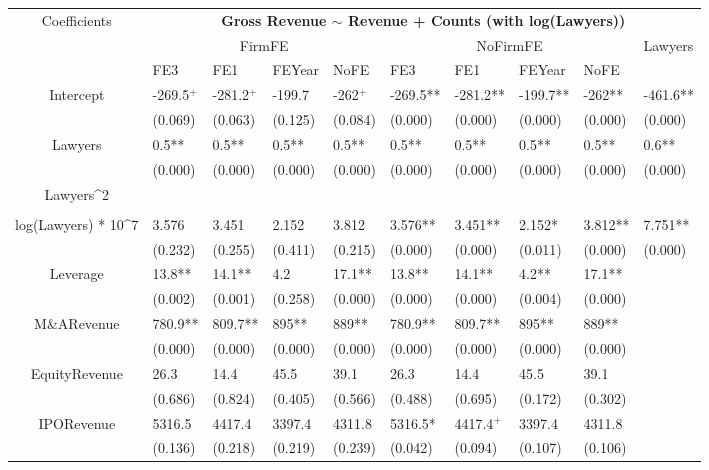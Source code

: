 \documentclass{article}
\begin{document}
\begin{table}[H]
\centering
\begin{tabular}{|clllllllll|}
\hline
\multirow{3}{*}{Coefficients} & \multicolumn{9}{c|}{\textbf{Gross Revenue $\sim$ Revenue + Counts (with log(Lawyers))}} \\
\cline{2-10}
& \multicolumn{4}{c}{FirmFE} & \multicolumn{4}{c}{NoFirmFE} & \multirow{2}{*}{Lawyers} \\
\cline{2-9}
& FE3 & FE1 & FEYear & NoFE & FE3 & FE1 & FEYear & NoFE &  \\
\hline
 
Intercept & -269.5$^{+}$ & -281.2$^{+}$ & -199.7 & -262$^{+}$ & -269.5** & -281.2** & -199.7** & -262** & -461.6** \\ 
   & (0.069) & (0.063) & (0.125) & (0.084) & (0.000) & (0.000) & (0.000) & (0.000) & (0.000) \\ 
  Lawyers & 0.5** & 0.5** & 0.5** & 0.5** & 0.5** & 0.5** & 0.5** & 0.5** & 0.6** \\ 
   & (0.000) & (0.000) & (0.000) & (0.000) & (0.000) & (0.000) & (0.000) & (0.000) & (0.000) \\ 
  Lawyers^2 &  &  &  &  &  &  &  &  &  \\ 
   &  &  &  &  &  &  &  &  &  \\ 
  log(Lawyers) * 10^7 & 3.576 & 3.451 & 2.152 & 3.812 & 3.576** & 3.451** & 2.152* & 3.812** & 7.751** \\ 
   & (0.232) & (0.255) & (0.411) & (0.215) & (0.000) & (0.000) & (0.011) & (0.000) & (0.000) \\ 
  Leverage & 13.8** & 14.1** & 4.2 & 17.1** & 13.8** & 14.1** & 4.2** & 17.1** &  \\ 
   & (0.002) & (0.001) & (0.258) & (0.000) & (0.000) & (0.000) & (0.004) & (0.000) &  \\ 
  M\&ARevenue & 780.9** & 809.7** & 895** & 889** & 780.9** & 809.7** & 895** & 889** &  \\ 
   & (0.000) & (0.000) & (0.000) & (0.000) & (0.000) & (0.000) & (0.000) & (0.000) &  \\ 
  EquityRevenue & 26.3 & 14.4 & 45.5 & 39.1 & 26.3 & 14.4 & 45.5 & 39.1 &  \\ 
   & (0.686) & (0.824) & (0.405) & (0.566) & (0.488) & (0.695) & (0.172) & (0.302) &  \\ 
  IPORevenue & 5316.5 & 4417.4 & 3397.4 & 4311.8 & 5316.5* & 4417.4$^{+}$ & 3397.4 & 4311.8 &  \\ 
   & (0.136) & (0.218) & (0.219) & (0.239) & (0.042) & (0.094) & (0.107) & (0.106) &  \\ 

\end{tabular}
\end{table}
\end{document}
